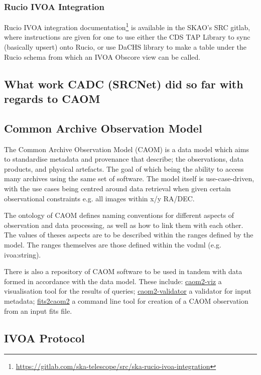 \subsubsection{Rucio IVOA Integration}

Rucio IVOA integration documentation\footnote{\url{https://gitlab.com/ska-telescope/src/ska-rucio-ivoa-integration}} 
is available in the SKAO's SRC gitlab, where instructions are given for one to use either the CDS TAP Library to sync (basically upsert) onto Rucio, or use DaCHS library to make a table under the Rucio schema from which an IVOA Obscore view can be called.

\subsection{What work CADC (SRCNet) did so far with regards to CAOM}

\subsection{Common Archive Observation Model}

The Common Archive Observation Model (CAOM) is a data model which aims to standardise metadata and provenance that describe; the observations, data products, and physical artefacts. The goal of which being the ability to access many archives using the same set of software. The model itself is use-case-driven, with the use cases being centred around data retrieval when given certain observational constraints e.g. all images within x/y RA/DEC. 

The ontology of CAOM defines naming conventions for different aspects of observation and data processing, as well as how to link them with each other. The values of theses aspects are to be described within the ranges defined by the model. The ranges themselves are those defined within the vodml (e.g. ivoa:string). 

There is also a repository of CAOM software to be used in tandem with data formed in accordance with the data model. These include: \href{https://github.com/opencadc/caom2/tree/master/caom2-viz}{caom2-viz} a visualisation tool for the results of queries; \href{https://github.com/opencadc/caom2/tree/master/caom2-validator}{caom2-validator} a validator for input metadata; \href{https://github.com/opencadc/caom2/tree/master/fits2caom2}{fits2caom2} a command line tool for creation of a CAOM observation from an input fits file. 

\subsection{IVOA Protocol}

